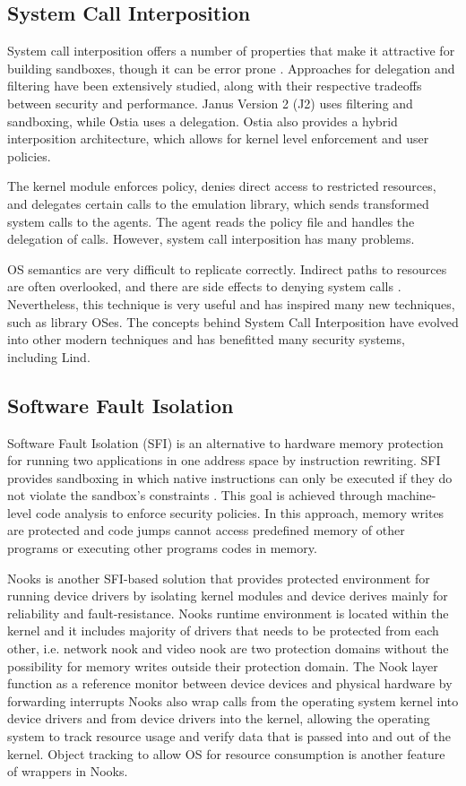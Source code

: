 \subsection{System Call Interposition}

System call interposition offers a number of properties that make it
attractive for building sandboxes, though it can be error prone
\cite{SCI-04}. Approaches for delegation and filtering have been
extensively studied,
along with their respective tradeoffs between security and
performance.
Janus Version 2 (J2) \cite{Janus0:96, Janus:99} uses filtering and
sandboxing, while Ostia \cite{SCI-04} uses a delegation.
Ostia also provides a hybrid interposition architecture, which allows
for kernel level enforcement and user policies.

The kernel module enforces policy, denies direct access to restricted
resources,
and delegates certain calls to the emulation library, which sends
transformed system calls to the agents.
The agent reads the policy file and handles the delegation of calls.
However, system call interposition has many problems.

OS semantics are very difficult to replicate correctly. Indirect paths
to resources are often overlooked,
and there are side effects to denying system calls
\cite{Problems-SCI}.
Nevertheless, this technique is very useful and has inspired many new
techniques, such as library OSes.
The concepts behind System Call Interposition have evolved into other
modern techniques
and has benefitted many security systems, including Lind. 

\subsection{Software Fault Isolation}
Software Fault Isolation (SFI) is an alternative to hardware memory
protection for running two applications in one address space by
instruction rewriting. SFI provides sandboxing in which native
instructions can only be executed if they do not violate the sandbox's
constraints \cite{SFI:93}. This goal is achieved through machine-level
code analysis to enforce security policies. In this approach, memory
writes are protected and code jumps cannot access predefined memory of
other programs or executing other programs codes in memory.

Nooks \cite{Nooks:03} is another SFI-based solution that provides
protected environment for running device drivers by isolating kernel
modules and device derives mainly for reliability and
fault-resistance. Nooks runtime environment is located within the
kernel and it includes majority of drivers that needs to be protected
from each other, i.e. network nook and video nook are two protection
domains without the possibility for memory writes outside their
protection domain. The Nook layer function as a reference monitor
between device devices and physical hardware by forwarding interrupts
Nooks also wrap calls from the operating system kernel into device
drivers and from device drivers into the kernel, allowing the
operating system to track resource usage and verify data that is
passed into and out of the kernel. Object tracking to allow OS for
resource consumption is another feature of wrappers in Nooks.


